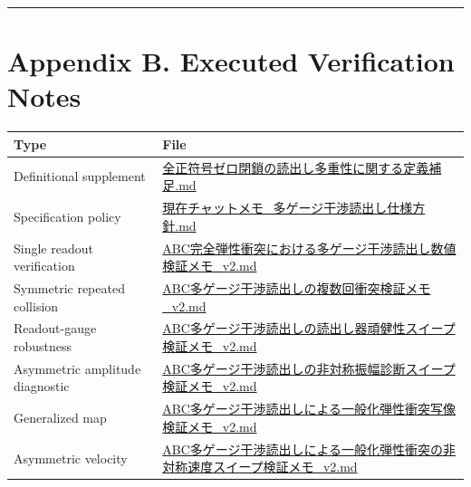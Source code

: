 \documentclass[
  a4paper,
]{article}
\newcounter{none} %
\begin{document}
\begin{center}\rule{0.5\linewidth}{0.5pt}\end{center}

\section{Appendix B. Executed Verification
Notes}\label{appendix-b.-executed-verification-notes}

{\def\LTcaptype{none} %
\begin{longtable}[]{@{}
  >{\raggedright\arraybackslash}p{}
  >{\raggedright\arraybackslash}p{}@{}}
\toprule\noalign{}
\begin{minipage}[b]{\linewidth}\raggedright
Type
\end{minipage} & \begin{minipage}[b]{\linewidth}\raggedright
File
\end{minipage} \\
\midrule\noalign{}
\endhead
\bottomrule\noalign{}
\endlastfoot
Definitional supplement &
\href{全正符号ゼロ閉鎖の読出し多重性に関する定義補足.md}{全正符号ゼロ閉鎖の読出し多重性に関する定義補足.md} \\
Specification policy &
\href{現在チャットメモ_多ゲージ干渉読出し仕様方針.md}{現在チャットメモ\_多ゲージ干渉読出し仕様方針.md} \\
Single readout verification &
\href{ABC完全弾性衝突における多ゲージ干渉読出し数値検証メモ_v2.md}{ABC完全弾性衝突における多ゲージ干渉読出し数値検証メモ\_v2.md} \\
Symmetric repeated collision &
\href{ABC多ゲージ干渉読出しの複数回衝突検証メモ_v2.md}{ABC多ゲージ干渉読出しの複数回衝突検証メモ\_v2.md} \\
Readout-gauge robustness &
\href{ABC多ゲージ干渉読出しの読出し器頑健性スイープ検証メモ_v2.md}{ABC多ゲージ干渉読出しの読出し器頑健性スイープ検証メモ\_v2.md} \\
Asymmetric amplitude diagnostic &
\href{ABC多ゲージ干渉読出しの非対称振幅診断スイープ検証メモ_v2.md}{ABC多ゲージ干渉読出しの非対称振幅診断スイープ検証メモ\_v2.md} \\
Generalized map &
\href{ABC多ゲージ干渉読出しによる一般化弾性衝突写像検証メモ_v2.md}{ABC多ゲージ干渉読出しによる一般化弾性衝突写像検証メモ\_v2.md} \\
Asymmetric velocity &
\href{ABC多ゲージ干渉読出しによる一般化弾性衝突の非対称速度スイープ検証メモ_v2.md}{ABC多ゲージ干渉読出しによる一般化弾性衝突の非対称速度スイープ検証メモ\_v2.md} \\

\end{longtable}}
\end{document}
